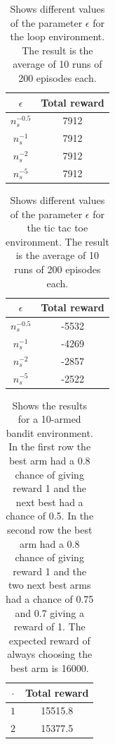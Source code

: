 \documentclass[11pt]{article}
\numberwithin{equation}{section}
\begin{document}
\begin{flushleft}
\begin{table}[H]
\caption{Shows different values of the parameter $\epsilon$ for the loop environment. The result is the average of 10 runs of 200 episodes each.}
\begin{center}
\begin{tabular}{|c|c|}
\hline
$\epsilon$ & Total reward \\ \hline
$n_s^{-0.5}$ & 7912 \\ \hline
$n_s^{-1}$ & 7912 \\ \hline
$n_s^{-2}$ & 7912 \\ \hline
$n_s^{-5}$ & 7912 \\
\hline
\end{tabular}
\label{tab:loopMean}
\end{center}
\end{table}

\begin{table}[H]
\caption{Shows different values of the parameter $\epsilon$ for the tic tac toe environment. The result is the average of 10 runs of 200 episodes each.}
\begin{center}
\begin{tabular}{|c|c|}
\hline
$\epsilon$ & Total reward \\ \hline
$n_s^{-0.5}$ & -5532 \\ \hline
$n_s^{-1}$ & -4269 \\ \hline
$n_s^{-2}$ & -2857 \\ \hline
$n_s^{-5}$ & -2522 \\
\hline
\end{tabular}
\label{tab:tttMean}
\end{center}
\end{table}

\begin{table}[H]
\caption{Shows the results for a 10-armed bandit environment. In the first row the best arm had a 0.8 chance of giving reward 1 and the next best had a chance of 0.5. In the second row the best arm had a 0.8 chance of giving reward 1 and the two next best arms had a chance of 0.75 and 0.7 giving a reward of 1. The expected reward of always choosing the best arm is 16000.}
\begin{center}
\begin{tabular}{|c|c|}
\hline
$\cdot$ & Total reward \\ \hline
$1$ & 15515.8 \\ \hline
$2$ & 15377.5 \\
\hline
\end{tabular}
\label{tab:UCBMean}
\end{center}
\end{table}


\end{flushleft}
\end{document}
